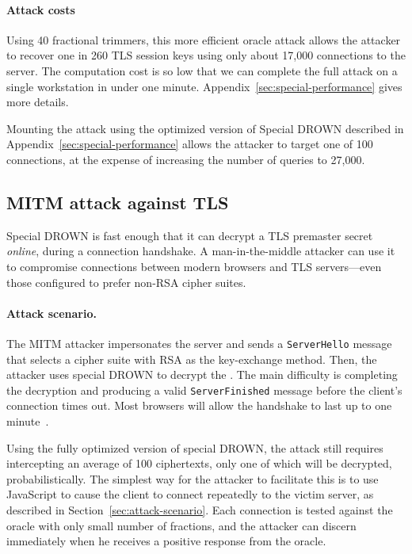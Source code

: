 \paragraph{Attack costs}
Using 40 fractional trimmers, this more efficient oracle attack allows
the attacker to recover one in 260 TLS session keys using only about
17,000 connections to the server.  The computation cost is so low that
we can complete the full attack on a single workstation in under one
minute. Appendix~\ref{sec:special-performance} gives more details.

Mounting the attack using the optimized version of Special DROWN
described in Appendix~\ref{sec:special-performance} allows the
attacker to target one of 100 connections, at the expense of
increasing the number of queries to 27,000.

\subsection{MITM attack against TLS}

Special DROWN is fast enough that it can decrypt a TLS premaster
secret \emph{online}, during a connection handshake.  A
man-in-the-middle attacker can use it to compromise connections
between modern browsers and TLS servers---even those configured to
prefer non-RSA cipher suites.

\paragraph{Attack scenario.}
The MITM attacker impersonates the server and sends a
\texttt{ServerHello} message that selects a cipher suite with RSA as
the key-exchange method.  Then, the attacker uses special DROWN to
decrypt the \pms.  The main difficulty is completing the decryption and producing a valid
\texttt{ServerFinished} message before the client's connection times
out.  Most browsers will allow the handshake to last up to one minute~\cite{LogJam}.

Using the fully optimized version of special DROWN, the attack still requires intercepting 
an average of 100 ciphertexts, only one of
which will be decrypted, probabilistically.  The simplest
way for the attacker to facilitate this is to use JavaScript to cause
the client to connect repeatedly to the victim server, as described in
Section~\ref{sec:attack-scenario}.  Each connection is tested
against the oracle with only small number of fractions, and the attacker can discern
immediately when he receives a positive response from the oracle.

